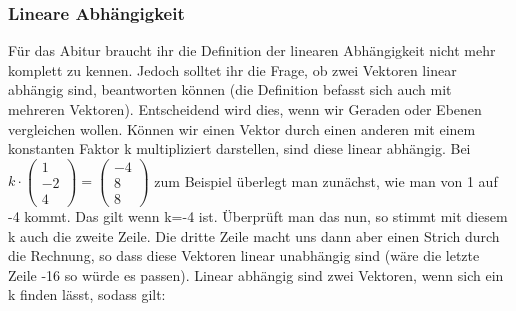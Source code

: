 	\subsubsection{Lineare Abhängigkeit}
		Für das Abitur braucht ihr die Definition der linearen Abhängigkeit nicht mehr
		komplett zu kennen. Jedoch solltet ihr die Frage, ob zwei Vektoren linear
		abhängig sind, beantworten können (die Definition befasst sich auch mit
		mehreren Vektoren). Entscheidend wird dies, wenn wir Geraden oder Ebenen
		vergleichen wollen. Können wir einen Vektor durch einen anderen mit einem
		konstanten Faktor k multipliziert darstellen, sind diese linear abhängig. Bei
		\(k\cdot \begin{pmatrix} 1\\
		 -2\\
		 4
		\end{pmatrix}=\begin{pmatrix}
		 -4\\
		 8\\
		 8
		\end{pmatrix}\)
		zum Beispiel überlegt man zunächst, wie man von 1 auf -4 kommt. Das gilt wenn
		k=-4 ist. Überprüft man das nun, so stimmt mit diesem k auch die zweite Zeile.
		Die dritte Zeile macht uns dann aber einen Strich durch die Rechnung, so dass
		diese Vektoren linear unabhängig sind (wäre die letzte Zeile -16 so würde es
		passen). Linear abhängig sind zwei Vektoren, wenn sich ein k finden lässt,
		sodass gilt:
		\formel{\[\vec{a}=k\cdot \vec{b}\]}
